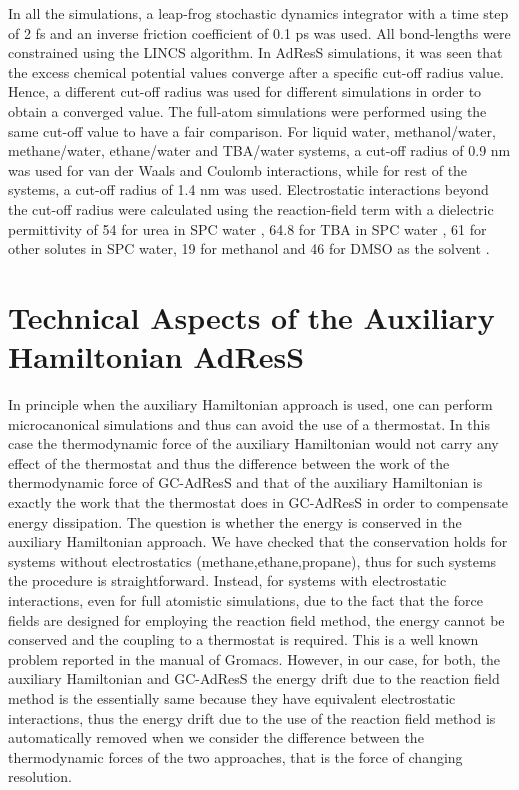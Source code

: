 \documentclass[a4paper,preprint,unsortedaddress]{revtex4-1}
\newcommand{\recheck}[1]{{\color{red} #1}}
\begin{document}
In all the simulations, a leap-frog stochastic dynamics integrator with a time step
of 2 fs and an inverse friction coefficient of 0.1 ps was used. All bond-lengths were constrained using the LINCS 
algorithm. In AdResS simulations, it was 
seen that the excess chemical potential values converge after a specific cut-off radius value. Hence, a different 
cut-off radius was used for different simulations in order to obtain a converged value. The full-atom simulations 
were performed using the same cut-off value to have a fair comparison. For liquid water, methanol/water, methane/water, ethane/water
and TBA/water systems, a cut-off radius of 0.9 nm was used for van der Waals and Coulomb interactions, while for rest 
of the systems, a cut-off radius of 1.4 nm was used. Electrostatic 
interactions beyond the cut-off radius were calculated using the reaction-field term \cite{rf} with a dielectric 
permittivity of 54 for urea in SPC water \cite{urea}, 64.8 for TBA in SPC water \cite{tba}, 61 for other solutes in SPC
water, 19 for methanol and 46 for DMSO as the solvent \cite{vang}.

\section{Technical Aspects of the Auxiliary Hamiltonian AdResS}
\recheck{In principle when the auxiliary Hamiltonian approach is used,
  one can perform microcanonical simulations and thus can avoid the
  use of a thermostat. In this case the thermodynamic force of the
  auxiliary Hamiltonian would not carry any effect of the thermostat and thus the difference between the work of the thermodynamic force of GC-AdResS and that of the auxiliary Hamiltonian is
  exactly the work that the thermostat does in GC-AdResS in order to compensate energy dissipation. The question is whether
  the energy is conserved in the auxiliary Hamiltonian approach. We
  have checked that the conservation holds for systems without
  electrostatics (methane,ethane,propane), thus for such systems the
  procedure is straightforward. Instead, for systems with
  electrostatic interactions, even for full atomistic simulations, due
  to the fact that the force fields are designed for employing the
  reaction field method, the energy cannot be conserved and the
  coupling to a thermostat is required. This is a well known problem
  reported in the manual of Gromacs. However, in our case, for both,
  the auxiliary Hamiltonian and GC-AdResS the energy drift due to the
  reaction field method is the essentially same because they have
  equivalent electrostatic interactions, thus the energy drift due to
  the use of the reaction field method is automatically removed when
  we consider the difference between the thermodynamic forces of the
  two approaches, that is the force of changing resolution.}
\end{document}
